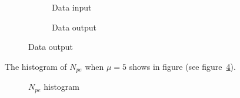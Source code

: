 \begin{figure}[H]
\begin{minipage}[b]{.5\textwidth}
\begin{figure}[H]
    \centering
    \resizebox{\textwidth}{!}{}
    \caption{\label{fig:input} Data input}
\end{figure}
\end{minipage}
\begin{minipage}[b]{.5\textwidth}
\begin{figure}[H]
    \centering
    \resizebox{\textwidth}{!}{}
    \caption{\label{fig:output} Data output}
\end{figure}
\end{minipage}
\end{figure}

The histogram of $N_{pe}$ when $\mu=5$ shows in figure (see figure~\ref{fig:penum}). 

\begin{figure}[H]
    \centering
    \scalebox{0.4}{}
    \caption{\label{fig:penum} $N_{pe}$ histogram}
\end{figure}

